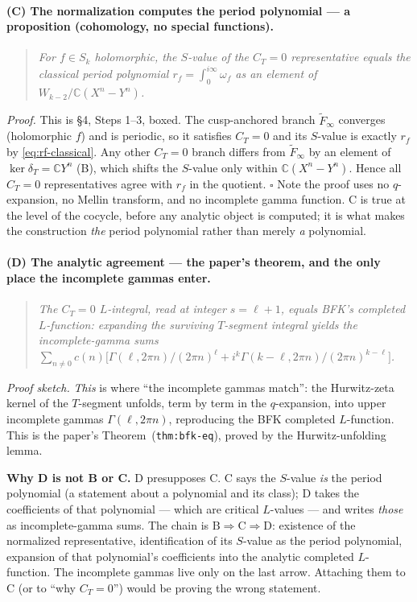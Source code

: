 \documentclass[11pt]{article}
\newcommand{\CC}{\mathbb{C}}
\newcommand{\Eich}{\widetilde{F}}
\begin{document}
\paragraph{(C) The normalization computes the period polynomial --- a
proposition (cohomology, no special functions).}
\begin{quote}\itshape
For $f \in S_k$ holomorphic, the $S$-value of the $C_T = 0$
representative equals the classical period polynomial
$r_f = \int_0^{i\infty}\omega_f$ as an element of
$W_{k-2}/\CC(X^n - Y^n)$.
\end{quote}
\noindent\emph{Proof.} This is \S4, Steps 1--3, boxed. The cusp-anchored
branch $\Eich_\infty$ converges (holomorphic $f$) and is periodic, so it
satisfies $C_T = 0$ and its $S$-value is exactly $r_f$ by
\eqref{eq:rf-classical}. Any other $C_T = 0$ branch differs from
$\Eich_\infty$ by an element of $\ker\delta_T = \CC Y^n$ (B), which shifts
the $S$-value only within $\CC(X^n - Y^n)$. Hence all $C_T = 0$
representatives agree with $r_f$ in the quotient. \hfill$\square$
\smallskip\noindent
Note the proof uses no $q$-expansion, no Mellin transform, and no
incomplete gamma function. C is true at the level of the cocycle, before
any analytic object is computed; it is what makes the construction
\emph{the} period polynomial rather than merely \emph{a} polynomial.

\paragraph{(D) The analytic agreement --- the paper's theorem, and the
only place the incomplete gammas enter.}
\begin{quote}\itshape
The $C_T = 0$ $L$-integral, read at integer $s = \ell+1$, equals BFK's
completed $L$-function: expanding the surviving $T$-segment integral
yields the incomplete-gamma sums
$\sum_{n\neq0} c(n)\bigl[\Gamma(\ell, 2\pi n)/(2\pi n)^\ell + i^k
\Gamma(k-\ell, 2\pi n)/(2\pi n)^{k-\ell}\bigr]$.
\end{quote}
\noindent\emph{Proof sketch.} \emph{This} is where ``the incomplete
gammas match'': the Hurwitz-zeta kernel of the $T$-segment unfolds, term
by term in the $q$-expansion, into upper incomplete gammas
$\Gamma(\ell, 2\pi n)$, reproducing the BFK completed $L$-function. This
is the paper's Theorem~(\texttt{thm:bfk-eq}), proved by the
Hurwitz-unfolding lemma.

\medskip
\noindent\textbf{Why D is not B or C.} D presupposes C. C says the
$S$-value \emph{is} the period polynomial (a statement about a polynomial
and its class); D takes the coefficients of that polynomial --- which are
critical $L$-values --- and writes \emph{those} as incomplete-gamma sums.
The chain is $\text{B} \Rightarrow \text{C} \Rightarrow \text{D}$:
existence of the normalized representative, identification of its $S$-value
as the period polynomial, expansion of that polynomial's coefficients
into the analytic completed $L$-function. The incomplete gammas live only
on the last arrow. Attaching them to C (or to ``why $C_T = 0$'') would be
proving the wrong statement.
\end{document}
